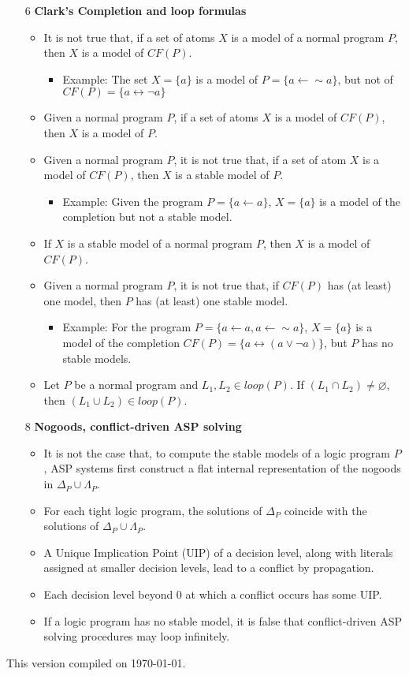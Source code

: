 \documentclass[9pt,a4paper,landscape]{article}
\begin{document}
{\begin{itemize}
	\item[6] \textbf{Clark's Completion and loop formulas}
	\begin{itemize}[noitemsep]
		\item It is not true that, if a set of atoms $X$ is a model of a normal program $P$, then $X$ is a model of $CF(P)$.
		\begin{itemize}[noitemsep]
			\item Example: The set $X = \{a\}$ is a model of $P = \{a \leftarrow \sim a\}$, but not of  $CF(P) = \{a \leftrightarrow \neg a\}$
		\end{itemize}
		\item Given a normal program $P$, if a set of atoms $X$ is a model of $CF(P)$, then $X$ is a model of $P$.
		\item Given a normal program $P$, it is not true that, if a set of atom $X$ is a model of $CF(P)$, then $X$ is a stable model of $P$.
		\begin{itemize}[noitemsep]
			\item Example: Given the program $P = \{a \leftarrow a\}$, $X = \{a\}$ is a model of the completion but not a stable model.
		\end{itemize}
		\item If $X$ is a stable model of a normal program $P$, then $X$ is a model of $CF(P)$.
		\item Given a normal program $P$, it is not true that, if $CF(P)$ has (at least) one model, then $P$ has (at least) one stable model.
		\begin{itemize}[noitemsep]
			\item Example: For the program $P = \{a \leftarrow a, a \leftarrow \sim a\}$, $X = \{a\}$ is a model of the completion $CF(P) = \{a \leftrightarrow (a \lor \neg a)\}$, but $P$ has no stable models.
		\end{itemize}
		\item Let $P$ be a normal program and $L_1, L_2 \in loop(P)$. If $(L_1 \cap L_2) \neq \varnothing$, then $(L_1 \cup L_2) \in loop(P)$.
	\end{itemize}
	
	\item[8] \textbf{Nogoods, conflict-driven ASP solving}
	\begin{itemize}[noitemsep]
		\item It is not the case that, to compute the stable models of a logic program $P$, ASP systems first construct a flat internal representation of the nogoods in $\Delta_P \cup \Lambda_P$.
		\item For each tight logic program, the solutions of $\Delta_P$ coincide with the solutions of $\Delta_P \cup \Lambda_P$.
		\item A Unique Implication Point (UIP) of a decision level, along with literals assigned at smaller decision levels, lead to a conflict by propagation.
		\item Each decision level beyond 0 at which a conflict occurs has some UIP.
		\item If a logic program has no stable model, it is false that conflict-driven ASP solving procedures may loop infinitely.
	\end{itemize}
\end{itemize}


\vfill \hfill This version compiled on \today.

}
	
\end{document}
